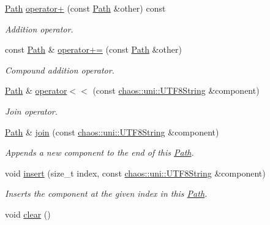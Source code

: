 \begin{DoxyCompactItemize}
\hyperlink{classchaos_1_1io_1_1sys_1_1_path}{Path} \hyperlink{classchaos_1_1io_1_1sys_1_1_path_a5e769fd87717e15f0580e9aacbc0a418}{operator+} (const \hyperlink{classchaos_1_1io_1_1sys_1_1_path}{Path} \&other) const 
\begin{DoxyCompactList}\small\item\em Addition operator. \end{DoxyCompactList}\item 
const \hyperlink{classchaos_1_1io_1_1sys_1_1_path}{Path} \& \hyperlink{classchaos_1_1io_1_1sys_1_1_path_a92a616d9f16047d8933020bab54ed494}{operator+=} (const \hyperlink{classchaos_1_1io_1_1sys_1_1_path}{Path} \&other)
\begin{DoxyCompactList}\small\item\em Compound addition operator. \end{DoxyCompactList}\item 
\hyperlink{classchaos_1_1io_1_1sys_1_1_path}{Path} \& \hyperlink{classchaos_1_1io_1_1sys_1_1_path_a9b3f24e1f3bcb8e989c4b21d70d0a052}{operator$<$$<$} (const \hyperlink{classchaos_1_1uni_1_1_u_t_f8_string}{chaos\+::uni\+::\+U\+T\+F8\+String} \&component)
\begin{DoxyCompactList}\small\item\em Join operator. \end{DoxyCompactList}\item 
\hyperlink{classchaos_1_1io_1_1sys_1_1_path}{Path} \& \hyperlink{classchaos_1_1io_1_1sys_1_1_path_a8fcd75bd349c4c6d1286f6549e34de8c}{join} (const \hyperlink{classchaos_1_1uni_1_1_u_t_f8_string}{chaos\+::uni\+::\+U\+T\+F8\+String} \&component)
\begin{DoxyCompactList}\small\item\em Appends a new component to the end of this \hyperlink{classchaos_1_1io_1_1sys_1_1_path}{Path}. \end{DoxyCompactList}\item 
void \hyperlink{classchaos_1_1io_1_1sys_1_1_path_a7dc2fc570f8475ba5147bffb01de7025}{insert} (size\+\_\+t index, const \hyperlink{classchaos_1_1uni_1_1_u_t_f8_string}{chaos\+::uni\+::\+U\+T\+F8\+String} \&component)
\begin{DoxyCompactList}\small\item\em Inserts the component at the given index in this \hyperlink{classchaos_1_1io_1_1sys_1_1_path}{Path}. \end{DoxyCompactList}\item 
void \hyperlink{classchaos_1_1io_1_1sys_1_1_path_a7c4cd7e5d8e21a8c522f8a87f1e90f4c}{clear} ()

\end{DoxyCompactItemize}
